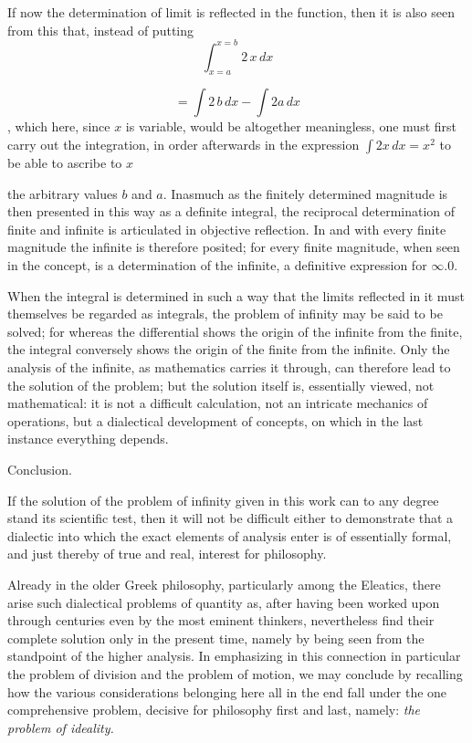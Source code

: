 \documentclass[12pt,a4paper,openany]{book}
\newcommand{\opage}[1]{\marginnote{\footnotesize\textit{[#1]}}}
\begin{document}
If now the determination of limit is reflected in the function, then
it is also seen from this that, instead of putting
\[ \int_{x=a}^{x=b}2\,x\,dx \]

\[ =\int 2\,b\,dx-\int 2a\,dx \]
, which here, since $x$
is variable, would
be altogether meaningless, one must first carry out the integration,
in order afterwards in the expression $\int 2x\,dx=x^{2}$ to be able to ascribe to $x$

the arbitrary values $b$ and $a$. Inasmuch as the finitely
determined magnitude is then presented in this way as a
definite integral, the reciprocal determination of finite and infinite is
articulated in objective reflection. In and with every finite
magnitude the infinite is therefore posited; for every finite
\setcounter{footnote}{0}%
\opage{115}magnitude, when seen in the concept, is a determination
of the infinite, a definitive expression for $\infty. 0.$

When the integral is determined in such a way that the limits
reflected in it must themselves be regarded as integrals, the
problem of infinity may be said to be solved; for whereas the differential
shows the origin of the infinite from the finite,
the integral conversely shows the origin of the finite from the
infinite. Only the analysis of the infinite, as mathematics
carries it through, can therefore lead to the solution of the problem;
but the solution itself is, essentially viewed, not
mathematical: it is not a difficult calculation, not an intricate
mechanics of operations, but a dialectical development of concepts,
on which in the last instance everything depends.

\begin{center}Conclusion.\end{center}

If the solution of the problem of infinity given in this work
can to any degree stand its scientific
test, then it will not be difficult either to demonstrate
that a dialectic into which the exact elements of analysis enter
is of essentially formal, and just thereby
of true and real, interest for philosophy.

Already in the older Greek philosophy, particularly
among the Eleatics, there arise such dialectical problems of quantity
as, after having been worked upon through centuries even
by the most eminent thinkers, nevertheless find their complete solution
only in the present time, namely by being seen from the standpoint of the higher analysis. In
emphasizing in this connection in particular the problem of division and
the problem of motion, we may conclude by recalling
how the various considerations belonging here all in the end
fall under the one comprehensive problem, decisive for philosophy first
\setcounter{footnote}{0}%
\opage{116}and last, namely: \emph{the problem of ideality.}
\end{document}

